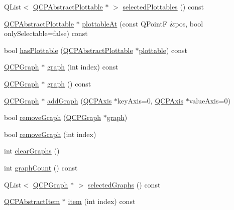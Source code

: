 \begin{DoxyCompactItemize}
\item 
Q\-List$<$ \hyperlink{class_q_c_p_abstract_plottable}{Q\-C\-P\-Abstract\-Plottable} $\ast$ $>$ \hyperlink{class_q_custom_plot_a6721b8c689bb7f2f400987e580508fe8}{selected\-Plottables} () const 
\item 
\hyperlink{class_q_c_p_abstract_plottable}{Q\-C\-P\-Abstract\-Plottable} $\ast$ \hyperlink{class_q_custom_plot_ac1d1bc6ae4e13616fb02cef6d9e2188e}{plottable\-At} (const Q\-Point\-F \&pos, bool only\-Selectable=false) const 
\item 
bool \hyperlink{class_q_custom_plot_a4fc28914e2ee91aab424b7ce46b6bdf1}{has\-Plottable} (\hyperlink{class_q_c_p_abstract_plottable}{Q\-C\-P\-Abstract\-Plottable} $\ast$\hyperlink{class_q_custom_plot_a32de81ff53e263e785b83b52ecd99d6f}{plottable}) const 
\item 
\hyperlink{class_q_c_p_graph}{Q\-C\-P\-Graph} $\ast$ \hyperlink{class_q_custom_plot_a6d3ed93c2bf46ab7fa670d66be4cddaf}{graph} (int index) const 
\item 
\hyperlink{class_q_c_p_graph}{Q\-C\-P\-Graph} $\ast$ \hyperlink{class_q_custom_plot_a80c40ced2a74eefe9e92de1e82ba2274}{graph} () const 
\item 
\hyperlink{class_q_c_p_graph}{Q\-C\-P\-Graph} $\ast$ \hyperlink{class_q_custom_plot_a6fb2873d35a8a8089842d81a70a54167}{add\-Graph} (\hyperlink{class_q_c_p_axis}{Q\-C\-P\-Axis} $\ast$key\-Axis=0, \hyperlink{class_q_c_p_axis}{Q\-C\-P\-Axis} $\ast$value\-Axis=0)
\item 
bool \hyperlink{class_q_custom_plot_a903561be895fb6528a770d66ac5e6713}{remove\-Graph} (\hyperlink{class_q_c_p_graph}{Q\-C\-P\-Graph} $\ast$\hyperlink{class_q_custom_plot_a6d3ed93c2bf46ab7fa670d66be4cddaf}{graph})
\item 
bool \hyperlink{class_q_custom_plot_a9554b3d2d5b10c0f884bd4010b6c192c}{remove\-Graph} (int index)
\item 
int \hyperlink{class_q_custom_plot_ab0f3abff2d2f7df3668b5836f39207fa}{clear\-Graphs} ()
\item 
int \hyperlink{class_q_custom_plot_a7d9b4d19114b2fde60f0233eeb0aa682}{graph\-Count} () const 
\item 
Q\-List$<$ \hyperlink{class_q_c_p_graph}{Q\-C\-P\-Graph} $\ast$ $>$ \hyperlink{class_q_custom_plot_ad2a0493bdd01e7aa99a4209ae3a5b67b}{selected\-Graphs} () const 
\item 
\hyperlink{class_q_c_p_abstract_item}{Q\-C\-P\-Abstract\-Item} $\ast$ \hyperlink{class_q_custom_plot_a3e842b5a65b1d17fbb96cfb1fa1314d1}{item} (int index) const 
\item 

\end{DoxyCompactItemize}
